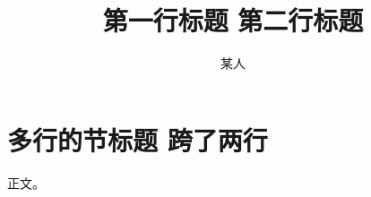 \documentclass{article}
\title{第一行标题
第二行标题}
\author{某人}
\begin{document}
\maketitle
\section{多行的节标题
跨了两行}
正文。
\end{document}
